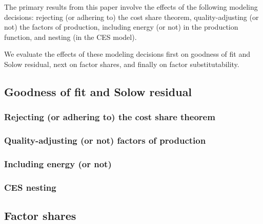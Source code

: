 \documentclass[preprint,authoryear,12pt]{elsarticle}\usepackage[]{graphicx}\usepackage[]{color}
\begin{document}
The primary results from this paper involve the effects of
the following modeling decisions:
rejecting (or adhering to) the cost share theorem,
quality-adjusting (or not) the factors of production,
including energy (or not) in the production function, and
nesting (in the CES model).





We evaluate the effects of these modeling decisions 
first on goodness of fit and Solow residual,
next on factor shares, and 
finally on factor substitutability.


\subsection{Goodness of fit and Solow residual} 
\label{sec:fit_and_sr}


\subsubsection{Rejecting (or adhering to) the cost share theorem} 
\label{sec:gfsr_cst}


\subsubsection{Quality-adjusting (or not) factors of production} 
\label{sec:gfsr_fop}


\subsubsection{Including energy (or not)} 
\label{sec:gfsr_energy}


\subsubsection{CES nesting} 
\label{sec:gfsr_nesting}






\subsection{Factor shares} 
\label{sec:shares}
\end{document}
